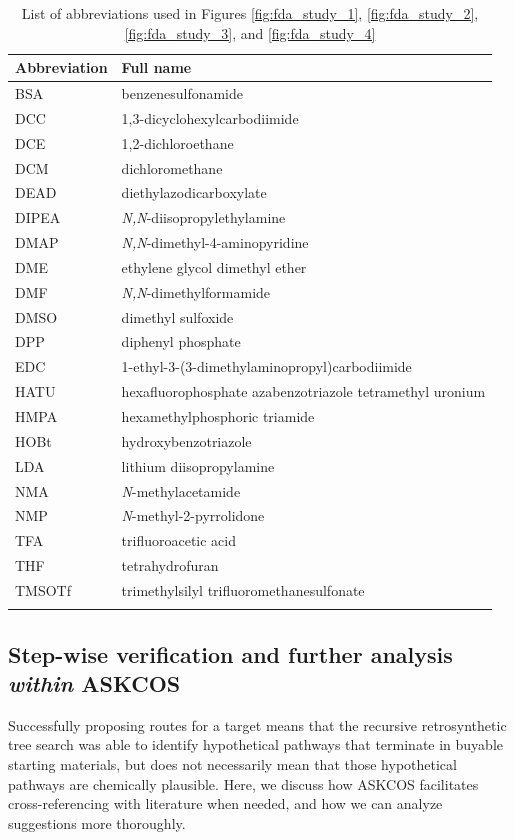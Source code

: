 \documentclass[pdflatex,sn-mathphys-num]{sn-jnl}%
\theoremstyle{thmstyleone}%
\theoremstyle{thmstyletwo}%
\theoremstyle{thmstylethree}%
\begin{document}
\begin{table}[h!]
\caption{List of abbreviations used in Figures \ref{fig:fda_study_1}, \ref{fig:fda_study_2}, \ref{fig:fda_study_3}, and \ref{fig:fda_study_4}}\label{table:abbreviations}
\begin{tabular*}{\textwidth}{@{\extracolsep\fill}ll}
\toprule
Abbreviation & Full name \\
\midrule
BSA & benzenesulfonamide \\
DCC & 1,3-dicyclohexylcarbodiimide \\
DCE & 1,2-dichloroethane \\
DCM & dichloromethane \\
DEAD & 	diethylazodicarboxylate \\
DIPEA & \emph{N,N}-diisopropylethylamine \\
DMAP & \emph{N,N}-dimethyl-4-aminopyridine \\
DME & ethylene glycol dimethyl ether \\
DMF & \emph{N,N}-dimethylformamide \\
DMSO & dimethyl sulfoxide \\
DPP & diphenyl phosphate \\
EDC & 1-ethyl-3-(3-dimethylaminopropyl)carbodiimide \\
HATU & hexafluorophosphate azabenzotriazole tetramethyl uronium\\
HMPA & hexamethylphosphoric triamide \\
HOBt & hydroxybenzotriazole \\
LDA & lithium diisopropylamine \\
NMA & \emph{N}-methylacetamide \\
NMP & \emph{N}-methyl-2-pyrrolidone \\
TFA & trifluoroacetic acid \\
THF & tetrahydrofuran \\
TMSOTf & trimethylsilyl trifluoromethanesulfonate \\
\botrule
\end{tabular*}
\end{table}

\subsection{Step-wise verification and further analysis \emph{within} ASKCOS} \label{verification_and_analysis}

Successfully proposing routes for a target means that the recursive retrosynthetic tree search was able to identify hypothetical pathways that terminate in buyable starting materials, but does not necessarily mean that those hypothetical pathways are chemically plausible. Here, we discuss how ASKCOS facilitates cross-referencing with literature when needed, and how we can analyze suggestions more thoroughly.
\end{document}
